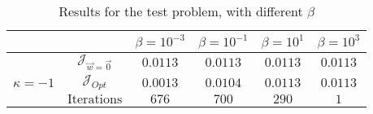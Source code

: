 \begin{table}
\begin{tabular}{ ||c|| c | c | c | c | c ||}
\hline
& & $\beta = 10^{-3}$ & $\beta = 10^{-1}$ & $\beta = 10^{1}$ & $\beta = 10^{3}$  \\
\hline
 & $\mathcal J_{\vec w = \vec 0}$ & $0.0113$ & $0.0113$ & $0.0113$ & $0.0113$ \\
$\kappa= -1$  & $\mathcal J_{Opt}$ & $0.0013$ & $0.0104$ & $0.0113$ & $0.0113$ \\
& $\text{Iterations}$ & $676$ & $700$ & $290$ & $1$ \\
\hline
\end{tabular}
\caption{Results for the test problem, with different $\beta$}
\label{TabS5:Prob12D}
\end{table}
